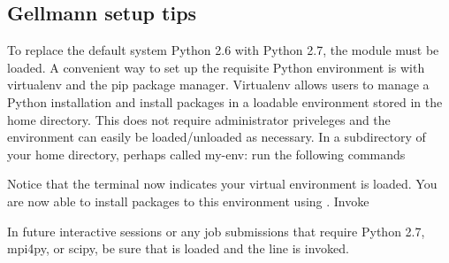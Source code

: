 \documentclass[letterpaper,10pt,english]{sphinxmanual}
\begin{document}
\subsection{Gellmann setup tips}
\label{\detokenize{setup:gellmann-setup-tips}}
To replace the default system Python 2.6 with Python 2.7, the 
module must be loaded.
A convenient way to set up the requisite Python environment is with virtualenv
and the pip package manager. Virtualenv allows users to manage a Python
installation and install packages in a loadable environment stored in the home directory.
This does not require administrator priveleges and the environment can easily be loaded/unloaded
as necessary.  In a subdirectory of your home directory, perhaps
called my-env: run the following commands

\begin{sphinxVerbatim}[commandchars=\\\{\}]
   
   
   
  
\end{sphinxVerbatim}

Notice that the terminal now indicates your virtual environment is loaded. You
are now able to install packages to this environment using . Invoke

\begin{sphinxVerbatim}[commandchars=\\\{\}]
  
  
\end{sphinxVerbatim}

In future interactive sessions or any job submissions that require Python 2.7,
mpi4py, or scipy, be sure that  is loaded and
the  line is invoked.
\end{document}
